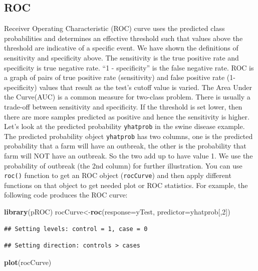 \documentclass[12pt,]{krantz}
\makeatletter
\newenvironment{Shaded}{\begin{snugshade}}{\end{snugshade}}
\newcommand{\DataTypeTok}[1]{\textcolor[rgb]{0.27,0.27,0.27}{#1}}
\newcommand{\DecValTok}[1]{\textcolor[rgb]{0.06,0.06,0.06}{#1}}
\newcommand{\KeywordTok}[1]{\textcolor[rgb]{0.27,0.27,0.27}{\textbf{#1}}}
\newcommand{\NormalTok}[1]{#1}
\newenvironment{kframe}{%
\medskip{}
\setlength{\fboxsep}{.8em}
 \def\at@end@of@kframe{}%
 \ifinner\ifhmode%
  \def\at@end@of@kframe{\end{minipage}}%
  \begin{minipage}{\columnwidth}%
 \fi\fi%
 \def\FrameCommand##1{\hskip\@totalleftmargin \hskip-\fboxsep
 \colorbox{shadecolor}{##1}\hskip-\fboxsep
     \hskip-\linewidth \hskip-\@totalleftmargin \hskip\columnwidth}%
 \MakeFramed {\advance\hsize-\width
   \@totalleftmargin\z@ \linewidth\hsize
   \@setminipage}}%
 {\par\unskip\endMakeFramed%
 \at@end@of@kframe}
\renewenvironment{Shaded}{\begin{kframe}}{\end{kframe}}
\makeatother
\begin{document}
\hypertarget{roc}{%
\subsection{ROC}\label{roc}}

Receiver Operating Characteristic (ROC) curve uses the predicted class probabilities and determines an effective threshold such that values above the threshold are indicative of a specific event. We have shown the definitions of sensitivity and specificity above. The sensitivity is the true positive rate and specificity is true negative rate. ``1 - specificity'' is the false negative rate. ROC is a graph of pairs of true positive rate (sensitivity) and false positive rate (1-specificity) values that result as the test's cutoff value is varied. The Area Under the Curve(AUC) is a common measure for two-class problem. There is usually a trade-off between sensitivity and specificity. If the threshold is set lower, then there are more samples predicted as positive and hence the sensitivity is higher. Let's look at the predicted probability \texttt{yhatprob} in the swine disease example. The predicted probability object \texttt{yhatprob} has two columns, one is the predicted probability that a farm will have an outbreak, the other is the probability that farm will NOT have an outbreak. So the two add up to have value 1. We use the probability of outbreak (the 2nd column) for further illustration. You can use \texttt{roc()} function to get an ROC object (\texttt{rocCurve}) and then apply different functions on that object to get needed plot or ROC statistics. For example, the following code produces the ROC curve:

\begin{Shaded}
\begin{Highlighting}[]
\KeywordTok{library}\NormalTok{(pROC)}
\NormalTok{rocCurve<-}\KeywordTok{roc}\NormalTok{(}\DataTypeTok{response=}\NormalTok{yTest,}
              \DataTypeTok{predictor=}\NormalTok{yhatprob[,}\DecValTok{2}\NormalTok{])}
\end{Highlighting}
\end{Shaded}

\begin{verbatim}
## Setting levels: control = 1, case = 0
\end{verbatim}

\begin{verbatim}
## Setting direction: controls > cases
\end{verbatim}

\begin{Shaded}
\begin{Highlighting}[]
\KeywordTok{plot}\NormalTok{(rocCurve)}
\end{Highlighting}
\end{Shaded}
\end{document}
